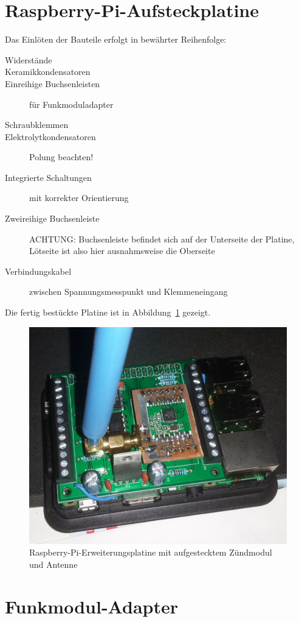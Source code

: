 \documentclass[paper=a4, parskip, numbers=noenddot, toc=listof, headsepline]{scrbook}
\begin{document}
		\section{Raspberry-Pi-Aufsteckplatine}
			\label{sec:raspipcb}

			Das Einlöten der Bauteile erfolgt in bewährter Reihenfolge:
			\begin{description}
				\item[Widerstände]
				\item[Keramikkondensatoren]
				\item[Einreihige Buchsenleisten] für Funkmoduladapter
				\item[Schraubklemmen]
				\item[Elektrolytkondensatoren] Polung beachten!
				\item[Integrierte Schaltungen] mit korrekter Orientierung
				\item[Zweireihige Buchsenleiste] ACHTUNG: Buchsenleiste befindet sich auf der Unterseite der Platine, Lötseite ist also hier ausnahmsweise die Oberseite
				\item[Verbindungskabel] zwischen Spannungsmesspunkt und Klemmeneingang
			\end{description}

			Die fertig bestückte Platine ist in Abbildung~\ref{fig:raspiextension} gezeigt.

			\begin{figure}
				\centering
				\includegraphics[width=.7\textwidth]{bilder/Piplatine}
				\caption{Raspberry-Pi-Erweiterungsplatine mit aufgestecktem Zündmodul und Antenne}
				\label{fig:raspiextension}
			\end{figure}

		\section{Funkmodul-Adapter}
\end{document}
